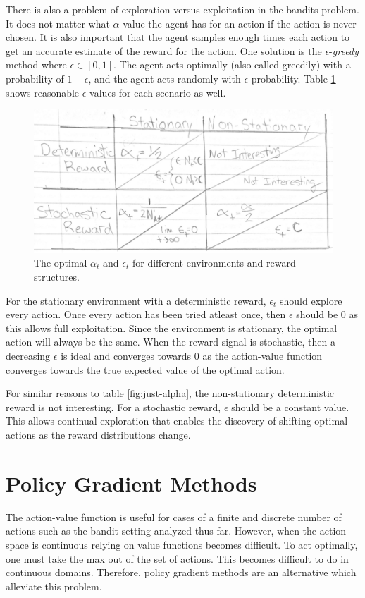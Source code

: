 \documentclass[twoside]{article}
\begin{document}
There is also a problem of exploration versus exploitation in the bandits problem.  It does not matter what $\alpha$ value the agent has for an action if the action is never chosen. It is also important that the agent samples enough times each action to get an accurate estimate of the reward for the action. One solution is the $\epsilon$-\emph{greedy} method where $\epsilon \in [0,1]$. The agent acts optimally (also called greedily) with a probability of $1-\epsilon$, and the agent acts randomly with $\epsilon$ probability. Table \ref{fig:full} shows reasonable $\epsilon$ values for each scenario as well.

\begin{figure}[H]
  \includegraphics[scale=0.4]{full.jpg}
  \caption{The optimal $\alpha_t$ and $\epsilon_t$ for different environments and reward structures.}
  \label{fig:full}
\end{figure}

For the stationary environment with a deterministic reward, $\epsilon_t$ should explore every action. Once every action has been tried atleast once, then $\epsilon$ should be 0 as this allows full exploitation. Since the environment is stationary, the optimal action will always be the same. When the reward signal is stochastic, then a decreasing $\epsilon$ is ideal and converges towards 0 as the action-value function converges towards the true expected value of the optimal action. 

For similar reasons to table \ref{fig:just-alpha}, the non-stationary deterministic reward is not interesting. For a stochastic reward, $\epsilon$ should be a constant value. This allows continual exploration that enables the discovery of shifting optimal actions as the reward distributions change.


\section{Policy Gradient Methods}
The action-value function is useful for cases of a finite and discrete number of actions such as the bandit setting analyzed thus far. However, when the action space is continuous relying on value functions becomes difficult. To act optimally, one must take the max out of the set of actions. This becomes difficult to do in continuous domains. Therefore, policy gradient methods are an alternative which alleviate this problem.
\end{document}
